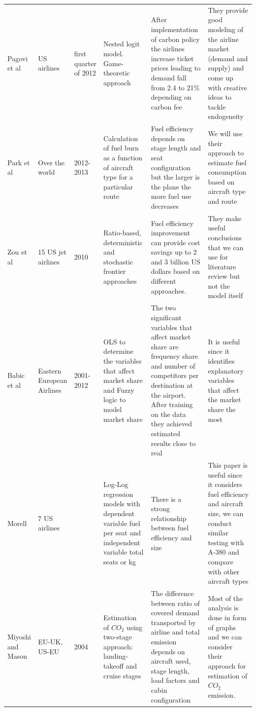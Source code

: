 \documentclass[titlepage, 11pt]{article}
\begin{document}
\begin{appendices}
\begin{footnotesize}
\begin{longtable}[h]{|  C{1 cm}  C{1cm}  C{1cm}   C{2cm} C{4cm}  C{5cm}|}
Pagovi et al \cite{carbon}& US airlines & first quarter of 2012 & Nested logit model. Game-theoretic approach & After implementation of carbon policy the airlines increase ticket prices leading to demand fall from 2.4 to 21\% depending on carbon fee & They provide good modeling of the airline market (demand and supply) and come up with creative ideas to tackle endogeneity \\[15mm]
Park et al \cite{seatconfig} & Over the world & 2012-2013 & Calculation of fuel burn as a function of aircraft type for a particular route & Fuel efficiency depends on stage length and seat configuration but the larger is the plane the more fuel use decreases & We will use their approach to estimate fuel consumption based on aircraft type and route \\[15mm] 
Zou et al \cite{US} & 15 US jet airlines & 2010 & Ratio-based, deterministic and stochastic frontier approaches & Fuel efficiency improvement can provide cost savings up to 2 and 3 billion US dollars based on different approaches. & They make useful conclusions that we can use for literature review but not the model itself \\[15mm] 
Babic et al \cite{marketshare} & Eastern European Airlines & 2001-2012 & OLS to determine the variables that affect market share and Fuzzy logic to model market share & The two significant variables that affect market share are frequency share and number of competitors per destination at the airport. After training on the data they achieved estimated results close to real & It is useful since it identifies explanatory variables that affect the market share the most \\[15mm] 
Morell \cite{larger} & 7 US airlines &  & Log-Log regression models with dependent variable fuel per seat and independent variable total seats or kg & There is a strong relationship between fuel efficiency and size & This paper is useful since it considers fuel efficiency and aircraft size, we can conduct similar testing with A-380 and compare with other aircraft types \\[15mm] \hline
Miyoshi and Mason \cite{threeMarket} & EU-UK, US-EU& 2004 & Estimation of $CO_2$ using two-stage approach: landing-takeoff and cruise stages & The difference between ratio of covered demand transported by airline and total emission depends on aircraft used, stage length, load factors and cabin configuration & Most of the analysis is done in form of graphs and we can consider their approach for estimation of $CO_2$ emission. \\[15mm] 

\end{longtable}
\end{footnotesize}
\end{appendices}
\end{document}

